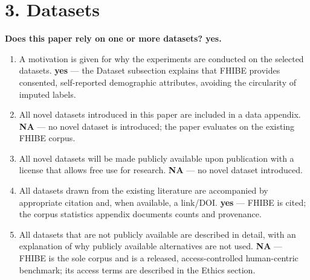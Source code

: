 \documentclass[letterpaper]{article}
\begin{document}
\section*{3. Datasets}
\noindent \textbf{Does this paper rely on one or more datasets? yes.}
\begin{enumerate}[leftmargin=*]
\item A motivation is given for why the experiments are conducted on the selected datasets. \textbf{yes} --- the Dataset subsection explains that FHIBE provides consented, self-reported demographic attributes, avoiding the circularity of imputed labels.
\item All novel datasets introduced in this paper are included in a data appendix. \textbf{NA} --- no novel dataset is introduced; the paper evaluates on the existing FHIBE corpus.
\item All novel datasets will be made publicly available upon publication with a license that allows free use for research. \textbf{NA} --- no novel dataset introduced.
\item All datasets drawn from the existing literature are accompanied by appropriate citation and, when available, a link/DOI. \textbf{yes} --- FHIBE is cited; the corpus statistics appendix documents counts and provenance.
\item All datasets that are not publicly available are described in detail, with an explanation of why publicly available alternatives are not used. \textbf{NA} --- FHIBE is the sole corpus and is a released, access-controlled human-centric benchmark; its access terms are described in the Ethics section.
\end{enumerate}
\end{document}
